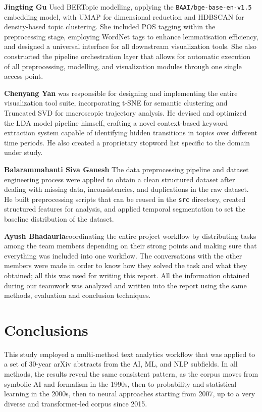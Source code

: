 \documentclass{article}
\begin{document}
\textbf{Jingting Gu} Used BERTopic modelling, applying
the \texttt{BAAI/bge-base-en-v1.5} embedding model,
with UMAP for dimensional reduction and HDBSCAN for density-based topic clustering.
She included POS tagging within the preprocessing stage, employing WordNet tags to enhance
lemmatisation efficiency, and designed a universal interface for all downstream visualization tools.
She also constructed the pipeline orchestration layer that allows for automatic execution of all
preprocessing, modelling, and visualization modules through one single access point.

\textbf{Chenyang Yan} was responsible for designing and implementing the entire
visualization tool suite, incorporating t-SNE for semantic clustering and Truncated SVD for macroscopic trajectory analysis. He devised and optimized the LDA model pipeline himself, crafting a novel context-based keyword extraction system capable of identifying hidden transitions in topics over different time periods. He also created a proprietary stopword list specific to the domain under study.

\textbf{Balarammahanti Siva Ganesh} The data preprocessing pipeline and dataset engineering
process were applied to obtain a clean structured
dataset after dealing with missing data, inconsistencies,
and duplications in the raw dataset. He built
preprocessing scripts that can be reused in the
\texttt{src} directory, created structured features for
analysis, and applied temporal segmentation to set the
baseline distribution of the dataset.

\textbf{Ayush Bhadauria}coordinating the entire project
workflow by distributing tasks among the team members
depending on their strong points and making sure
that everything was included into one workflow.
The conversations with the other members were made in
order to know how they solved the task and what they
obtained; all this was used for writing this report.
All the information obtained during our teamwork was
analyzed and written into the report using the same
methods, evaluation and conclusion techniques.


\section{Conclusions}
\label{sec:conclusions}

This study employed a multi-method text analytics workflow that was
applied to a set of 30-year arXiv abstracts from the AI, ML, and NLP subfields.
In all methods, the results reveal the same consistent pattern, as the corpus moves
from symbolic AI and formalism in the 1990s, then to probability and statistical
learning in the 2000s, then to neural approaches starting from 2007, up to a very
diverse and transformer-led corpus since 2015.
\end{document}
